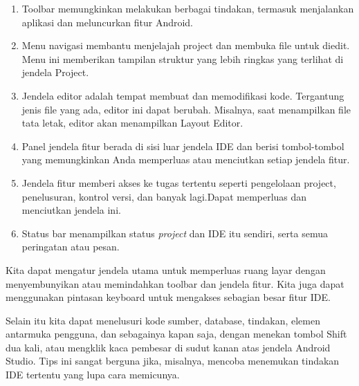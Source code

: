 \begin{enumerate}
    \item Toolbar memungkinkan  melakukan berbagai tindakan, termasuk menjalankan aplikasi dan meluncurkan fitur Android.
    \item Menu navigasi membantu menjelajah project dan membuka file untuk diedit. Menu ini memberikan tampilan struktur yang lebih ringkas yang terlihat di jendela Project.
    \item Jendela editor adalah tempat membuat dan memodifikasi kode. Tergantung jenis file yang ada, editor ini dapat berubah. Misalnya, saat menampilkan file tata letak, editor akan menampilkan Layout Editor.
    \item Panel jendela fitur berada di sisi luar jendela IDE dan berisi tombol-tombol yang memungkinkan Anda memperluas atau menciutkan setiap jendela fitur.
    \item Jendela fitur memberi akses ke tugas tertentu seperti pengelolaan project, penelusuran, kontrol versi, dan banyak lagi.Dapat memperluas dan menciutkan jendela ini.
    \item Status bar menampilkan status \textit{project} dan IDE itu sendiri, serta semua peringatan atau pesan.
\end{enumerate}
\par Kita dapat mengatur jendela utama untuk memperluas ruang layar dengan menyembunyikan atau memindahkan toolbar dan jendela fitur. Kita juga dapat menggunakan pintasan keyboard untuk mengakses sebagian besar fitur IDE.

\par Selain itu kita dapat menelusuri kode sumber, database, tindakan, elemen antarmuka pengguna, dan sebagainya kapan saja, dengan menekan tombol Shift dua kali, atau mengklik kaca pembesar di sudut kanan atas jendela Android Studio. Tips ini sangat berguna jika, misalnya, mencoba menemukan tindakan IDE tertentu yang lupa cara memicunya.
